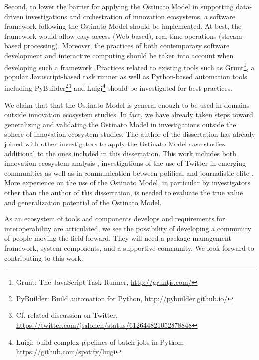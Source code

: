 Second, to lower the barrier for applying the Ostinato Model in supporting data-driven investigations and orchestration of innovation ecosystems, a software framework following the Ostinato Model should be implemented. At best, the framework would allow easy access (Web-based), real-time operations (stream-based processing). Moreover, the practices of both contemporary software development and interactive computing should be taken into account when developing such a framework. Practices related to existing tools such as Grunt\footnote{Grunt: The JavaScript Task Runner, \url{http://gruntjs.com/}}, a popular Javascript-based task runner as well as Python-based automation tools including PyBuilder\footnote{PyBuilder: Build automation for Python, \url{http://pybuilder.github.io/}}\footnote{Cf. related discussion on Twitter, \url{https://twitter.com/jsalonen/status/612644821052878848}} and Luigi\footnote{Luigi: build complex pipelines of batch jobs in Python, \url{https://github.com/spotify/luigi}} should be investigated for best practices.

We claim that that the Ostinato Model is general enough to be used in domains outside innovation ecosystem studies. In fact, we have already taken steps toward generalizing and validating the Ostinato Model in investigations outside the sphere of innovation ecosystem studies. The author of the dissertation has already joined with other investigators to apply the Ostinato Model case studies additional to the ones included in this dissertation. This work includes both innovation ecosystem analysis \citep{Russell2015RelationalEcosystems}, investigations of the use of Twitter in emerging communities \citep{Aramo-Immonen2015ExploringData,Jussila2014,Aramo-Immonen2016VisualizingModel} as well as in communication between political and journalistic elite 
\citep{Ruoho2015,Vainikka2015TviittienTwitterissa}. More experience on the use of the Ostinato Model, in particular by investigators other than the author of this dissertation, is needed to evaluate the true value and generalization potential of the Ostinato Model.

As an ecosystem of tools and components develops and requirements for interoperability are articulated, we see the possibility of developing a community of people moving the field forward. They will need a package management framework, system components, and a supportive community. We look forward to contributing to this work.